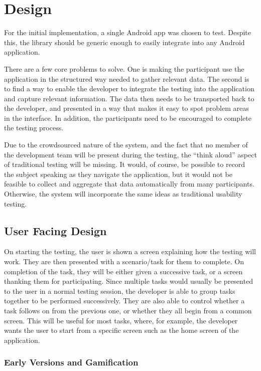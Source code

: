 \chapter{Design}

For the initial implementation, a single Android app was chosen to test. Despite
this, the library should be generic enough to easily integrate into any Android
application.

There are a few core problems to solve.
One is making the participant use the application in the structured way needed to
gather relevant data. The second is to find a way to enable the developer to integrate
the testing into the application and capture relevant information. The data then needs
to be transported back to the developer, and presented in a way that makes it easy to spot
problem areas in the interface. In addition, the participants need to be encouraged to complete the testing process.

Due to the crowdsourced nature of the system, and the fact that no member of the
development team will be present during the testing, the ``think aloud'' aspect
of traditional testing will be missing. It would, of course, be possible to
record the subject speaking as they navigate the application, but it would not
be feasible to collect and aggregate that data automatically from many
participants. Otherwise, the system will incorporate the same ideas as
traditional usability testing.

\section{User Facing Design}

On starting the testing, the user is shown a screen explaining how the testing
will work. They are then presented with a scenario/task for them to complete. On
completion of the task, they will be either given a successive task, or a screen
thanking them for participating. Since multiple tasks would usually be presented to the user in a normal testing session, the developer is able to group tasks together to be performed successively. They are also able to control whether a task follows on from the previous one, or whether they all begin from a common screen. This will be useful for most tasks, where, for example, the developer wants the user to start from a specific screen such as the home screen of the application.

\subsection{Early Versions and Gamification}

